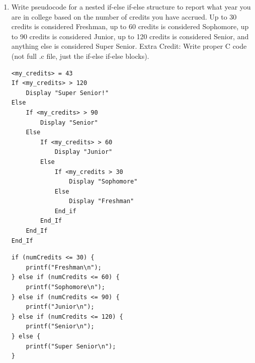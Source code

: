 \documentclass[letter,11pt]{article}
\begin{document}
\begin{enumerate}
\begin{verbatim}
printf("%d + %d = %d\n", num1, num2, sum);    -- 1 + 1 = 2
num1 = num2;
num2 = sum;
sum = num1 + num2;
printf("%d + %d = %d\n", num1, num2, sum);    -- 1 + 2 = 3
num1 = num2;
num2 = sum;
sum = num1 + num2;
printf("%d + %d = %d\n", num1, num2, sum);    -- 2 + 3 = 5
\end{verbatim}

    \item Write pseudocode for a nested if-else if-else structure to report what year you are in college based on the number of credits you have accrued. Up to 30 credits is considered Freshman, up to 60 credits is considered Sophomore, up to 90 credits is considered Junior, up to 120 credits is considered Senior, and anything else is considered Super Senior. Extra Credit: Write proper C code (not full .c file, just the if-else if-else blocks).

\begin{verbatim}
<my_credits> = 43
If <my_credits> > 120
    Display "Super Senior!"
Else
    If <my_credits> > 90
        Display "Senior"
    Else
        If <my_credits> > 60
            Display "Junior"
        Else
            If <my_credits > 30
                Display "Sophomore"
            Else
                Display "Freshman"
            End_if
        End_If
    End_If
End_If
\end{verbatim}

\begin{verbatim}
if (numCredits <= 30) {
    printf("Freshman\n");
} else if (numCredits <= 60) {
    printf("Sophomore\n");
} else if (numCredits <= 90) {
    printf("Junior\n");
} else if (numCredits <= 120) {
    printf("Senior\n");
} else {
    printf("Super Senior\n");
}
\end{verbatim}

\end{enumerate}
\end{document}
